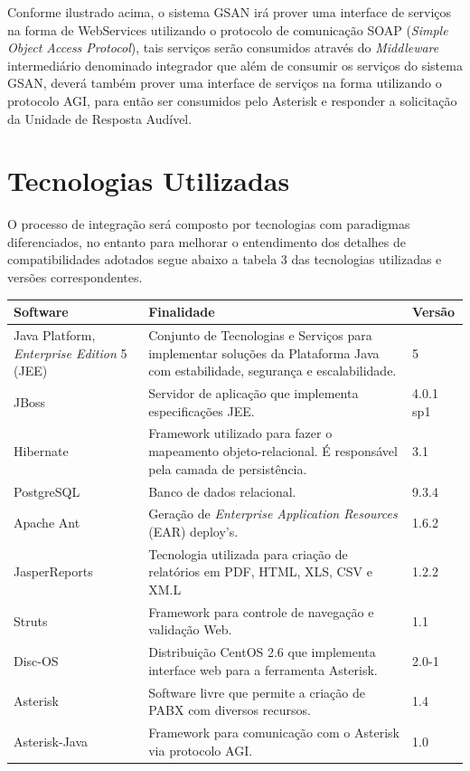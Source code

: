 Conforme ilustrado acima, o sistema GSAN irá prover uma interface de serviços na forma de WebServices utilizando o protocolo de comunicação SOAP (\textit{Simple Object Access Protocol}), tais serviços serão consumidos através do \textit{Middleware} intermediário denominado integrador que além de consumir os serviços do sistema GSAN, deverá também prover uma interface de serviços na forma utilizando o protocolo AGI, para então ser consumidos pelo Asterisk e responder a solicitação da Unidade de Resposta Audível.


\section{Tecnologias Utilizadas}
O processo de integração será composto por tecnologias com paradigmas diferenciados, no entanto para melhorar o entendimento dos detalhes de compatibilidades adotados segue abaixo a tabela 3 das tecnologias utilizadas e versões correspondentes.


\begin{table}[htb]
	\center
	\footnotesize
	\begin{tabular}{|p{4cm}|p{7cm}|p{2cm}|}
		\hline
		\textbf{Software} & \textbf{Finalidade} & \textbf{Versão} \\
		\hline
		Java Platform, \textit{Enterprise Edition} 5 (JEE) & Conjunto de Tecnologias e Serviços para implementar soluções da Plataforma Java com estabilidade, segurança e escalabilidade. & 5 \\
		\hline
		JBoss & Servidor de aplicação que implementa especificações JEE. & 4.0.1 sp1 \\
		\hline
		Hibernate & Framework utilizado para fazer o mapeamento objeto-relacional. É responsável pela camada de persistência. & 3.1 \\
		\hline
		PostgreSQL & Banco de dados relacional. & 9.3.4 \\
		\hline
		Apache Ant & Geração de \textit{Enterprise Application Resources} (EAR) deploy’s. & 1.6.2 \\
		\hline
		JasperReports & Tecnologia utilizada para criação de relatórios em PDF, HTML, XLS, CSV e XM.L & 1.2.2 \\
		\hline
		Struts & Framework para controle de navegação e validação Web. & 1.1	 \\
		\hline
		Disc-OS & Distribuição CentOS 2.6 que implementa interface web para a ferramenta Asterisk. & 2.0-1 \\
		\hline
		Asterisk & Software livre que permite a criação de PABX com diversos recursos. & 1.4 \\		
		\hline
		Asterisk-Java & Framework para comunicação com o Asterisk via protocolo AGI. & 1.0 \\				
	\end{tabular}
\end{table}


